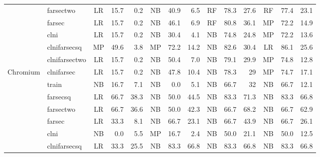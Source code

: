 \begin{table*}[!htbp]
\begin{tabular}{l|l|c|r|r|c|r|r|c|r|r|c|r|r}
 & farsectwo & LR & 15.7 & 0.2 & NB & 40.9 & 6.5 & \cellcolor[HTML]{EFEFEF}RF & \cellcolor[HTML]{EFEFEF}78.3 & 27.6 & RF & 77.4 & 23.1 \\  
 & farsec & LR & 15.7 & 0.2 & NB & 46.1 & 6.9 & \cellcolor[HTML]{EFEFEF}RF & \cellcolor[HTML]{EFEFEF}80.8 & 36.1 & MP & 72.2 & 14.9 \\  
 & clni & LR & 15.7 & 0.2 & NB & 30.4 & 4.1 & \cellcolor[HTML]{EFEFEF}NB & \cellcolor[HTML]{EFEFEF}74.8 & 24.8 & MP & 72.2 & 13.6 \\  
 & clnifarsecsq & MP & 49.6 & 3.8 & MP & 72.2 & 14.2 & NB & 82.6 & 30.4 & \cellcolor[HTML]{EFEFEF}LR & \cellcolor[HTML]{EFEFEF}86.1 & \cellcolor[HTML]{EFEFEF}25.6 \\  
 & clnifarsectwo & LR & 15.7 & 0.2 & NB & 50.4 & 7.0 & \cellcolor[HTML]{EFEFEF}NB & \cellcolor[HTML]{EFEFEF}79.1 & \cellcolor[HTML]{EFEFEF}29.9 & MP & 74.8 & 12.8 \\  
\multirow{-8}{*}{Chromium} & clnifarsec & LR & 15.7 & 0.2 & NB & 47.8 & 10.4 & \cellcolor[HTML]{EFEFEF}NB & \cellcolor[HTML]{EFEFEF}78.3 & \cellcolor[HTML]{EFEFEF}29 & MP & 74.7 & 17.1 \\ \hline
 & train & NB & 16.7 & 7.1 & NB & 0.0 & 5.1 & \cellcolor[HTML]{EFEFEF}NB & \cellcolor[HTML]{EFEFEF}66.7 & 32 & \cellcolor[HTML]{EFEFEF}NB & \cellcolor[HTML]{EFEFEF}66.7 & 12.1 \\  
 & farsecsq & LR & 66.7 & 38.3 & NB & 50.0 & 44.5 & \cellcolor[HTML]{EFEFEF}NB & \cellcolor[HTML]{EFEFEF}83.3 & 71.3 & \cellcolor[HTML]{EFEFEF}NB & \cellcolor[HTML]{EFEFEF}83.3 & 66.8 \\  
 & farsectwo & \cellcolor[HTML]{EFEFEF}LR & \cellcolor[HTML]{EFEFEF}66.7 & 36.6 & NB & 50.0 & 42.3 & \cellcolor[HTML]{EFEFEF}NB & \cellcolor[HTML]{EFEFEF}66.7 & 68.2 & \cellcolor[HTML]{EFEFEF}NB & \cellcolor[HTML]{EFEFEF}66.7 & 62.9 \\  
 & farsec & LR & 33.3 & 8.1 & \cellcolor[HTML]{EFEFEF}NB & \cellcolor[HTML]{EFEFEF}66.7 & 23.1 & \cellcolor[HTML]{EFEFEF}NB & \cellcolor[HTML]{EFEFEF}66.7 & 43.9 & \cellcolor[HTML]{EFEFEF}NB & \cellcolor[HTML]{EFEFEF}66.7 & 26.1 \\  
 & clni & NB & 0.0 & 5.5 & MP & 16.7 & 2.4 & \cellcolor[HTML]{EFEFEF}NB & \cellcolor[HTML]{EFEFEF}50.0 & 21.1 & \cellcolor[HTML]{EFEFEF}NB & \cellcolor[HTML]{EFEFEF}50.0 & 12.5 \\  
 & clnifarsecsq & LR & 33.3 & 25.5 & \cellcolor[HTML]{EFEFEF}NB & \cellcolor[HTML]{EFEFEF}83.3 & 66.8 & \cellcolor[HTML]{EFEFEF}NB & \cellcolor[HTML]{EFEFEF}83.3 & 66.8 & \cellcolor[HTML]{EFEFEF}NB & \cellcolor[HTML]{EFEFEF}83.3 & 66.8 \\  

\end{tabular}
\end{table*}
